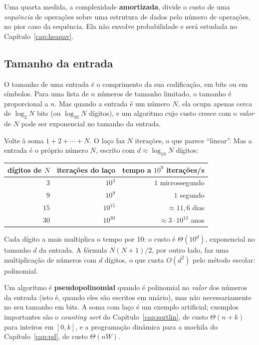 Uma quarta medida, a complexidade \textbf{amortizada}, divide o custo de uma \emph{sequência} de operações sobre uma estrutura de dados pelo número de operações, no pior caso da sequência. Ela não envolve probabilidade e será estudada no Capítulo~\ref{cap:heapav}.

\subsection*{Tamanho da entrada}
O tamanho de uma entrada é o comprimento da sua codificação, em bits ou em símbolos. Para uma lista de $n$ números de tamanho limitado, o tamanho é proporcional a $n$. Mas quando a entrada é um número $N$, ela ocupa apenas cerca de $\log_2 N$ bits (ou $\log_{10}N$ dígitos), e um algoritmo cujo custo cresce com o \emph{valor} de $N$ pode ser exponencial no tamanho da entrada.

\begin{exemplo}\label{ex:somalaco}
Volte à soma $1+2+\cdots+N$. O laço faz $N$ iterações, o que parece ``linear''. Mas a entrada é o próprio número $N$, escrito com $d\approx\log_{10}N$ dígitos:
\begin{center}\small
\begin{tabular}{@{}rrr@{}}
\toprule
dígitos de $N$ & iterações do laço & tempo a $10^9$ iterações/s\\
\midrule
$3$ & $10^3$ & $1$ microssegundo\\
$9$ & $10^9$ & $1$ segundo\\
$15$ & $10^{15}$ & $\approx 11{,}6$ dias\\
$30$ & $10^{30}$ & $\approx3\cdot10^{13}$ anos\\
\bottomrule
\end{tabular}
\end{center}
Cada dígito a mais multiplica o tempo por 10: o custo é $\Theta(10^d)$, exponencial no tamanho $d$ da entrada. A fórmula $N(N+1)/2$, por outro lado, faz uma multiplicação de números com $d$ dígitos, o que custa $O(d^2)$ pelo método escolar: polinomial.
\end{exemplo}

Um algoritmo é \textbf{pseudopolinomial} quando é polinomial no \emph{valor} dos números da entrada (isto é, quando eles são escritos em unário), mas não necessariamente no seu tamanho em bits. A soma com laço é um exemplo artificial; exemplos importantes são o \emph{counting sort} do Capítulo~\ref{cap:sortlin}, de custo $\Theta(n+k)$ para inteiros em $[0,k]$, e a programação dinâmica para a mochila do Capítulo~\ref{cap:pd}, de custo $\Theta(nW)$.

